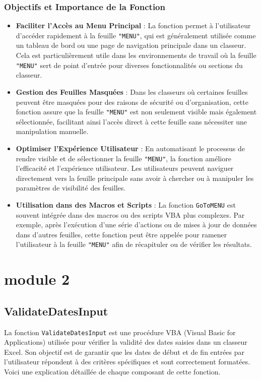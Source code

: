\documentclass[a4paper, oneside, 12pt, final]{extreport}
\begin{document}
\subsubsection{Objectifs et Importance de la Fonction}
\begin{itemize}
    \item \textbf{Faciliter l'Accès au Menu Principal} : La fonction permet à l'utilisateur d'accéder rapidement à la feuille \texttt{"MENU"}, qui est généralement utilisée comme un tableau de bord ou une page de navigation principale dans un classeur. Cela est particulièrement utile dans les environnements de travail où la feuille \texttt{"MENU"} sert de point d'entrée pour diverses fonctionnalités ou sections du classeur.
    \item \textbf{Gestion des Feuilles Masquées} : Dans les classeurs où certaines feuilles peuvent être masquées pour des raisons de sécurité ou d'organisation, cette fonction assure que la feuille \texttt{"MENU"} est non seulement visible mais également sélectionnée, facilitant ainsi l'accès direct à cette feuille sans nécessiter une manipulation manuelle.
    \item \textbf{Optimiser l'Expérience Utilisateur} : En automatisant le processus de rendre visible et de sélectionner la feuille \texttt{"MENU"}, la fonction améliore l'efficacité et l'expérience utilisateur. Les utilisateurs peuvent naviguer directement vers la feuille principale sans avoir à chercher ou à manipuler les paramètres de visibilité des feuilles.
    \item \textbf{Utilisation dans des Macros et Scripts} : La fonction \texttt{GoToMENU} est souvent intégrée dans des macros ou des scripts VBA plus complexes. Par exemple, après l'exécution d'une série d'actions ou de mises à jour de données dans d'autres feuilles, cette fonction peut être appelée pour ramener l'utilisateur à la feuille \texttt{"MENU"} afin de récapituler ou de vérifier les résultats.
\end{itemize}

\section{module 2}
\subsection{ValidateDatesInput}

La fonction \texttt{ValidateDatesInput} est une procédure VBA (Visual Basic for Applications) utilisée pour vérifier la validité des dates saisies dans un classeur Excel. Son objectif est de garantir que les dates de début et de fin entrées par l'utilisateur répondent à des critères spécifiques et sont correctement formatées. Voici une explication détaillée de chaque composant de cette fonction.
\end{document}
